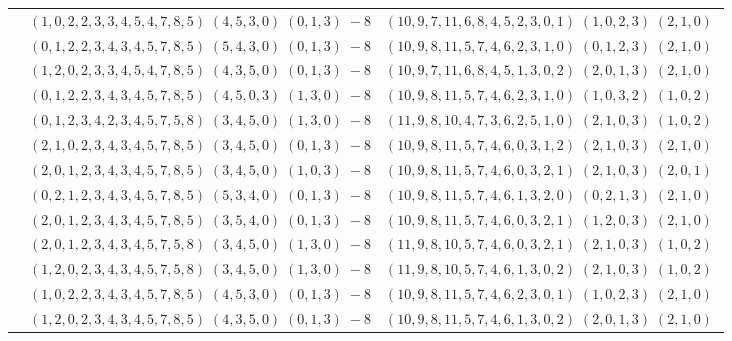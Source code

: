 \documentclass[11pt]{article}
\begin{document}
\begin{longtable}[l]{|c|c|c|}
 \cline{2-3} 
 & $(1 ,0 ,2 ,2 ,3 ,3 ,4 ,5 ,4 ,7 ,8 ,5) \;(4 ,5 ,3 ,0) \;(0 ,1 ,3) \;-8$ & $(10 ,9 ,7 ,11 ,6 ,8 ,4 ,5 ,2 ,3 ,0 ,1) \;(1 ,0 ,2 ,3) \;(2 ,1 ,0) \;$\\ 
 \cline{2-3} 
 & $(0 ,1 ,2 ,2 ,3 ,4 ,3 ,4 ,5 ,7 ,8 ,5) \;(5 ,4 ,3 ,0) \;(0 ,1 ,3) \;-8$ & $(10 ,9 ,8 ,11 ,5 ,7 ,4 ,6 ,2 ,3 ,1 ,0) \;(0 ,1 ,2 ,3) \;(2 ,1 ,0) \;$\\ 
 \cline{2-3} 
 & $(1 ,2 ,0 ,2 ,3 ,3 ,4 ,5 ,4 ,7 ,8 ,5) \;(4 ,3 ,5 ,0) \;(0 ,1 ,3) \;-8$ & $(10 ,9 ,7 ,11 ,6 ,8 ,4 ,5 ,1 ,3 ,0 ,2) \;(2 ,0 ,1 ,3) \;(2 ,1 ,0) \;$\\ 
 \cline{2-3} 
 & $(0 ,1 ,2 ,2 ,3 ,4 ,3 ,4 ,5 ,7 ,8 ,5) \;(4 ,5 ,0 ,3) \;(1 ,3 ,0) \;-8$ & $(10 ,9 ,8 ,11 ,5 ,7 ,4 ,6 ,2 ,3 ,1 ,0) \;(1 ,0 ,3 ,2) \;(1 ,0 ,2) \;$\\ 
 \cline{2-3} 
 & $(0 ,1 ,2 ,3 ,4 ,2 ,3 ,4 ,5 ,7 ,5 ,8) \;(3 ,4 ,5 ,0) \;(1 ,3 ,0) \;-8$ & $(11 ,9 ,8 ,10 ,4 ,7 ,3 ,6 ,2 ,5 ,1 ,0) \;(2 ,1 ,0 ,3) \;(1 ,0 ,2) \;$\\ 
 \cline{2-3} 
 & $(2 ,1 ,0 ,2 ,3 ,4 ,3 ,4 ,5 ,7 ,8 ,5) \;(3 ,4 ,5 ,0) \;(0 ,1 ,3) \;-8$ & $(10 ,9 ,8 ,11 ,5 ,7 ,4 ,6 ,0 ,3 ,1 ,2) \;(2 ,1 ,0 ,3) \;(2 ,1 ,0) \;$\\ 
 \cline{2-3} 
 & $(2 ,0 ,1 ,2 ,3 ,4 ,3 ,4 ,5 ,7 ,8 ,5) \;(3 ,4 ,5 ,0) \;(1 ,0 ,3) \;-8$ & $(10 ,9 ,8 ,11 ,5 ,7 ,4 ,6 ,0 ,3 ,2 ,1) \;(2 ,1 ,0 ,3) \;(2 ,0 ,1) \;$\\ 
 \cline{2-3} 
 & $(0 ,2 ,1 ,2 ,3 ,4 ,3 ,4 ,5 ,7 ,8 ,5) \;(5 ,3 ,4 ,0) \;(0 ,1 ,3) \;-8$ & $(10 ,9 ,8 ,11 ,5 ,7 ,4 ,6 ,1 ,3 ,2 ,0) \;(0 ,2 ,1 ,3) \;(2 ,1 ,0) \;$\\ 
 \cline{2-3} 
 & $(2 ,0 ,1 ,2 ,3 ,4 ,3 ,4 ,5 ,7 ,8 ,5) \;(3 ,5 ,4 ,0) \;(0 ,1 ,3) \;-8$ & $(10 ,9 ,8 ,11 ,5 ,7 ,4 ,6 ,0 ,3 ,2 ,1) \;(1 ,2 ,0 ,3) \;(2 ,1 ,0) \;$\\ 
 \cline{2-3} 
 & $(2 ,0 ,1 ,2 ,3 ,4 ,3 ,4 ,5 ,7 ,5 ,8) \;(3 ,4 ,5 ,0) \;(1 ,3 ,0) \;-8$ & $(11 ,9 ,8 ,10 ,5 ,7 ,4 ,6 ,0 ,3 ,2 ,1) \;(2 ,1 ,0 ,3) \;(1 ,0 ,2) \;$\\ 
 \cline{2-3} 
 & $(1 ,2 ,0 ,2 ,3 ,4 ,3 ,4 ,5 ,7 ,5 ,8) \;(3 ,4 ,5 ,0) \;(1 ,3 ,0) \;-8$ & $(11 ,9 ,8 ,10 ,5 ,7 ,4 ,6 ,1 ,3 ,0 ,2) \;(2 ,1 ,0 ,3) \;(1 ,0 ,2) \;$\\ 
 \cline{2-3} 
 & $(1 ,0 ,2 ,2 ,3 ,4 ,3 ,4 ,5 ,7 ,8 ,5) \;(4 ,5 ,3 ,0) \;(0 ,1 ,3) \;-8$ & $(10 ,9 ,8 ,11 ,5 ,7 ,4 ,6 ,2 ,3 ,0 ,1) \;(1 ,0 ,2 ,3) \;(2 ,1 ,0) \;$\\ 
 \cline{2-3} 
 & $(1 ,2 ,0 ,2 ,3 ,4 ,3 ,4 ,5 ,7 ,8 ,5) \;(4 ,3 ,5 ,0) \;(0 ,1 ,3) \;-8$ & $(10 ,9 ,8 ,11 ,5 ,7 ,4 ,6 ,1 ,3 ,0 ,2) \;(2 ,0 ,1 ,3) \;(2 ,1 ,0) \;$\\ 

\end{longtable}
\end{document}
